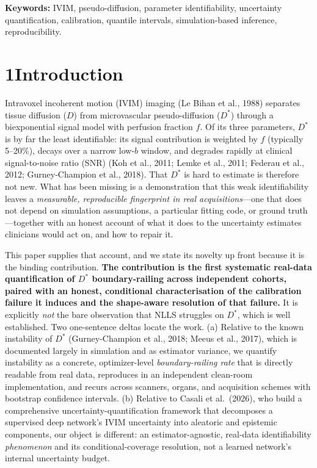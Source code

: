 \documentclass[11pt]{article}
\newcommand{\Dstar}{\ensuremath{D^{*}}}
\begin{document}
\vspace{0.4em}
\noindent\textbf{Keywords:} IVIM, pseudo-diffusion, parameter identifiability,
uncertainty quantification, calibration, quantile intervals, simulation-based inference,
reproducibility.

\section*{1\quad Introduction}

Intravoxel incoherent motion (IVIM) imaging (Le Bihan et al., 1988) separates tissue
diffusion ($D$) from microvascular pseudo-diffusion (\Dstar{}) through a biexponential
signal model with perfusion fraction $f$. Of its three parameters, \Dstar{} is by far
the least identifiable: its signal contribution is weighted by $f$ (typically 5--20\%),
decays over a narrow low-$b$ window, and degrades rapidly at clinical signal-to-noise
ratio (SNR) (Koh et al., 2011; Lemke et al., 2011; Federau et al., 2012;
Gurney-Champion et al., 2018). That \Dstar{} is hard to estimate is therefore not new.
What has been missing is a demonstration that this weak identifiability leaves a
\emph{measurable, reproducible fingerprint in real acquisitions}---one that does not
depend on simulation assumptions, a particular fitting code, or ground truth---together
with an honest account of what it does to the uncertainty estimates clinicians would
act on, and how to repair it.

This paper supplies that account, and we state its novelty up front because it is the
binding contribution. \textbf{The contribution is the first systematic real-data
quantification of \Dstar{} boundary-railing across independent cohorts, paired with an
honest, conditional characterisation of the calibration failure it induces and the
shape-aware resolution of that failure.} It is explicitly \emph{not} the bare
observation that NLLS struggles on \Dstar{}, which is well established. Two one-sentence
deltas locate the work. (a) Relative to the known instability of \Dstar{}
(Gurney-Champion et al., 2018; Meeus et al., 2017), which is documented largely in
simulation and as estimator variance, we quantify instability as a concrete,
optimizer-level \emph{boundary-railing rate} that is directly readable from real data,
reproduces in an independent clean-room implementation, and recurs across scanners,
organs, and acquisition schemes with bootstrap confidence intervals. (b) Relative to
Casali et al.\ (2026), who build a comprehensive uncertainty-quantification framework
that decomposes a supervised deep network's IVIM uncertainty into aleatoric and
epistemic components, our object is different: an estimator-agnostic, real-data
identifiability \emph{phenomenon} and its conditional-coverage resolution, not a learned
network's internal uncertainty budget.
\end{document}
